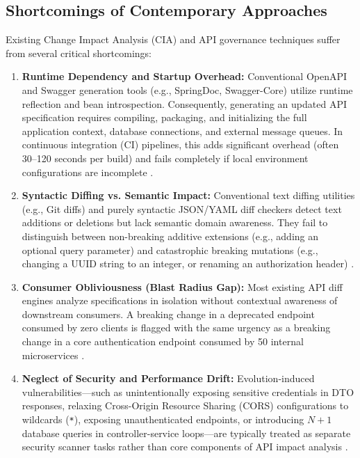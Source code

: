 \documentclass[conference]{IEEEtran}
\begin{document}
\subsection{Shortcomings of Contemporary Approaches}
Existing Change Impact Analysis (CIA) and API governance techniques suffer from several critical shortcomings:
\begin{enumerate}
    \item \textbf{Runtime Dependency and Startup Overhead:} Conventional OpenAPI and Swagger generation tools (e.g., SpringDoc, Swagger-Core) utilize runtime reflection and bean introspection. Consequently, generating an updated API specification requires compiling, packaging, and initializing the full application context, database connections, and external message queues. In continuous integration (CI) pipelines, this adds significant overhead (often 30--120 seconds per build) and fails completely if local environment configurations are incomplete \cite{wittern2017generating}.
    \item \textbf{Syntactic Diffing vs. Semantic Impact:} Conventional text diffing utilities (e.g., Git diffs) and purely syntactic JSON/YAML diff checkers detect text additions or deletions but lack semantic domain awareness. They fail to distinguish between non-breaking additive extensions (e.g., adding an optional query parameter) and catastrophic breaking mutations (e.g., changing a UUID string to an integer, or renaming an authorization header) \cite{nielebock2021guided, zhou2016api}.
    \item \textbf{Consumer Obliviousness (Blast Radius Gap):} Most existing API diff engines analyze specifications in isolation without contextual awareness of downstream consumers. A breaking change in a deprecated endpoint consumed by zero clients is flagged with the same urgency as a breaking change in a core authentication endpoint consumed by 50 internal microservices \cite{chen2020holistic, decan2019empirical}.
    \item \textbf{Neglect of Security and Performance Drift:} Evolution-induced vulnerabilities---such as unintentionally exposing sensitive credentials in DTO responses, relaxing Cross-Origin Resource Sharing (CORS) configurations to wildcards (\texttt{*}), exposing unauthenticated endpoints, or introducing $N+1$ database queries in controller-service loops---are typically treated as separate security scanner tasks rather than core components of API impact analysis \cite{alshammari2022restsec, gallais2020api}.
\end{enumerate}
\end{document}
